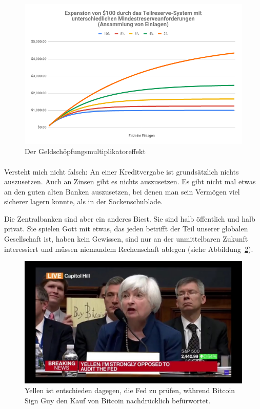 \begin{figure}
  \centering
  \includegraphics{assets/images/money-multiplier-de.png}
  \caption{Der Geldschöpfungsmultiplikatoreffekt}
  \label{fig:money-multiplier}
\end{figure}

\paragraph{}
Versteht mich nicht falsch: An einer Kreditvergabe ist grundsätzlich nichts
auszusetzen. Auch an Zinsen gibt es nichts auszusetzen. Es gibt nicht mal etwas
an den guten alten Banken auszusetzen, bei denen man sein Vermögen viel sicherer
lagern konnte, als in der Sockenschublade.

Die Zentralbanken sind aber ein anderes Biest. Sie sind halb öffentlich und halb
privat. Sie spielen Gott mit etwas, das jeden betrifft der Teil unserer globalen
Gesellschaft ist, haben kein Gewissen, sind nur an der unmittelbaren Zukunft
interessiert und müssen niemandem Rechenschaft ablegen (siehe
Abbildung~\ref{fig:bsg}).

\begin{figure}
  \centering
  \includegraphics{assets/images/bsg.jpg}
  \caption{Yellen ist entschieden dagegen, die Fed zu prüfen, während Bitcoin
  Sign Guy den Kauf von Bitcoin nachdrücklich befürwortet.}
  \label{fig:bsg}
\end{figure}

